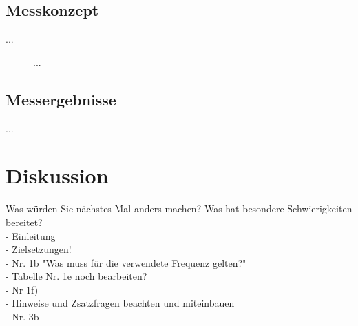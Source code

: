 \documentclass[a4paper,12pt]{article}
\begin{document}
\subsection{Messkonzept}
...

\begin{figure}[H]
    \centering
\caption{...}
\end{figure}


\subsection{Messergebnisse}
...




\section{Diskussion}
Was würden Sie nächstes Mal anders machen? Was hat besondere Schwierigkeiten bereitet?\\

- Einleitung\\ 
- Zielsetzungen!\\

- Nr. 1b "Was muss für die verwendete Frequenz gelten?"\\
- Tabelle Nr. 1e noch  bearbeiten?\\
- Nr 1f)\\
- Hinweise und Zsatzfragen beachten und miteinbauen\\

- Nr. 3b 
\end{document}
